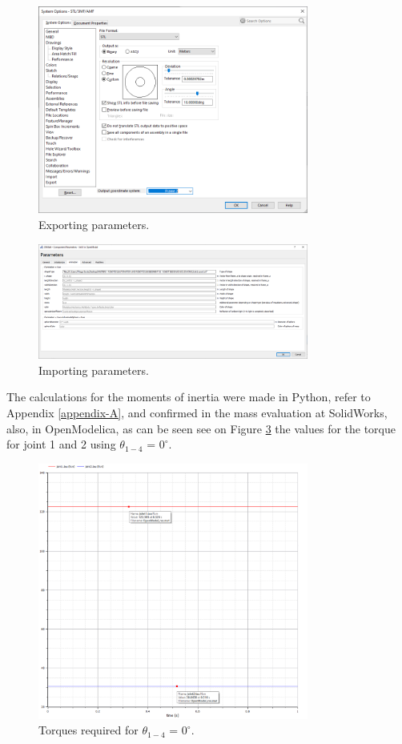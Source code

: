 \documentclass[transmag]{IEEEtran}
\begin{document}
\begin{figure}
\centerline{\includegraphics[width=3.5in]{./images/exportSolidworks}}
\caption{Exporting parameters.\label{exportSolidworks}}
\end{figure}

\begin{figure}
\centerline{\includegraphics[width=3.5in]{./images/importOpenModelicaParameters}}
\caption{Importing parameters.\label{importOpenModelicaParameters}}
\end{figure}


The calculations for the moments of inertia were made in Python, refer to Appendix \ref{appendix-A}, and confirmed in the mass evaluation at SolidWorks, also, in OpenModelica, as can be seen see on Figure \ref{taus} the values for the torque for joint 1 and 2 using $\theta_{1-4}$ = $0^{\circ}$.

\begin{figure}
\centerline{\includegraphics[width=3.5in]{./images/taus}}
\caption{Torques required for $\theta_{1-4}$ = $0^{\circ}$.\label{taus}}
\end{figure}
\end{document}
